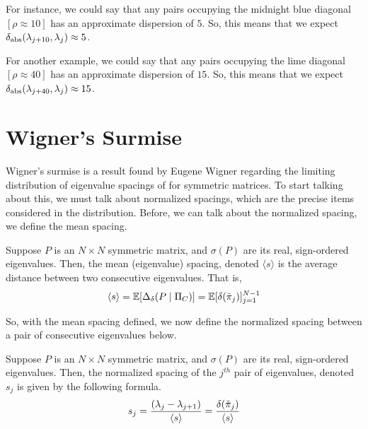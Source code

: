 For instance, we could say that any pairs occupying the midnight blue diagonal $[\rho \approx 10]$ has an approximate dispersion of $5$.
So, this means that we expect $\delta_{\text{abs}}(\lambda_{j + 10}, \lambda_j) \approx 5$.

For another example, we could say that any pairs occupying the lime diagonal $[\rho \approx 40]$ has an approximate dispersion of $15$.
So, this means that we expect $\delta_{\text{abs}}(\lambda_{j + 40}, \lambda_j) \approx 15$.

%
%

\newpage
\section{Wigner's Surmise}


Wigner's surmise is a result found by Eugene Wigner regarding the limiting distribution of eigenvalue spacings of for symmetric matrices.
To start talking about this, we must talk about normalized spacings, which are the precise items considered in the distribution.
Before, we can talk about the normalized spacing, we define the mean spacing.

\begin{definition}
Suppose $P$ is an $N \times N$ symmetric matrix, and $\sigma(P)$ are its real, sign-ordered eigenvalues.
Then, the mean (eigenvalue) spacing, denoted $\langle s \rangle$ is the average distance between two consecutive eigenvalues. That is,
$$\langle s \rangle = \mathbb{E}[\Delta_\delta(P \mid \Pi_C)] = \mathbb{E}[\delta({\tilde{\pi}}_{j})]_{j = 1}^{N - 1}$$
\end{definition}

\noindent So, with the mean spacing defined, we now define the normalized spacing between a pair of consecutive eigenvalues below.

\begin{definition}
Suppose $P$ is an $N \times N$ symmetric matrix, and $\sigma(P)$ are its real, sign-ordered eigenvalues.
Then, the normalized spacing of the $j^{th}$ pair of eigenvalues, denoted $s_j$ is given by the following formula.
$$s_j = \frac{(\lambda_j - \lambda_{j+1})}{{\langle s \rangle}} = \frac{\delta({\tilde{\pi}}_{j})}{\langle s \rangle}$$
\end{definition}

